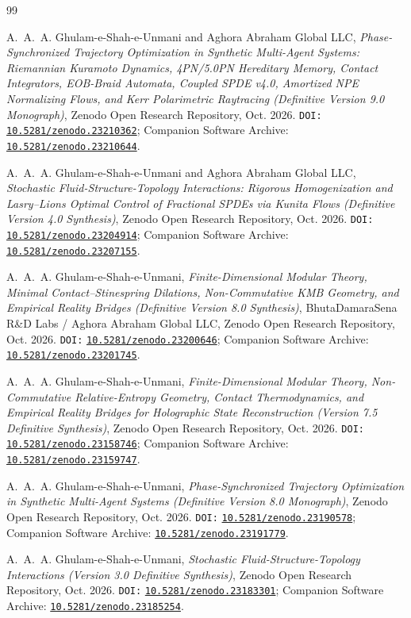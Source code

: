\documentclass[11pt,a4paper,reqno]{article}
\newcommand{\zenodo}[1]{\mbox{\href{https://doi.org/10.5281/zenodo.#1}{\texttt{10.5281/zenodo.#1}}}}
\theoremstyle{plain}
\theoremstyle{definition}
\theoremstyle{remark}
\numberwithin{equation}{section}
\begin{document}
\clearpage
\begin{thebibliography}{99}

A.~A.~A. Ghulam-e-Shah-e-Unmani and {Aghora Abraham Global LLC}, \emph{Phase-Synchronized Trajectory Optimization in Synthetic Multi-Agent Systems: Riemannian Kuramoto Dynamics, 4PN/5.0PN Hereditary Memory, Contact Integrators, EOB-Braid Automata, Coupled SPDE v4.0, Amortized NPE Normalizing Flows, and Kerr Polarimetric Raytracing (Definitive Version 9.0 Monograph)}, Zenodo Open Research Repository, Oct. 2026. \texttt{DOI:} \zenodo{23210362}; Companion Software Archive: \zenodo{23210644}.

A.~A.~A. Ghulam-e-Shah-e-Unmani and {Aghora Abraham Global LLC}, \emph{Stochastic Fluid-Structure-Topology Interactions: Rigorous Homogenization and Lasry--Lions Optimal Control of Fractional SPDEs via Kunita Flows (Definitive Version 4.0 Synthesis)}, Zenodo Open Research Repository, Oct. 2026. \texttt{DOI:} \zenodo{23204914}; Companion Software Archive: \zenodo{23207155}.

A.~A.~A. Ghulam-e-Shah-e-Unmani, \emph{Finite-Dimensional Modular Theory, Minimal Contact--Stinespring Dilations, Non-Commutative KMB Geometry, and Empirical Reality Bridges (Definitive Version 8.0 Synthesis)}, BhutaDamaraSena R\&D Labs / Aghora Abraham Global LLC, Zenodo Open Research Repository, Oct. 2026. \texttt{DOI:} \zenodo{23200646}; Companion Software Archive: \zenodo{23201745}.

A.~A.~A. Ghulam-e-Shah-e-Unmani, \emph{Finite-Dimensional Modular Theory, Non-Commutative Relative-Entropy Geometry, Contact Thermodynamics, and Empirical Reality Bridges for Holographic State Reconstruction (Version 7.5 Definitive Synthesis)}, Zenodo Open Research Repository, Oct. 2026. \texttt{DOI:} \zenodo{23158746}; Companion Software Archive: \zenodo{23159747}.

A.~A.~A. Ghulam-e-Shah-e-Unmani, \emph{Phase-Synchronized Trajectory Optimization in Synthetic Multi-Agent Systems (Definitive Version 8.0 Monograph)}, Zenodo Open Research Repository, Oct. 2026. \texttt{DOI:} \zenodo{23190578}; Companion Software Archive: \zenodo{23191779}.

A.~A.~A. Ghulam-e-Shah-e-Unmani, \emph{Stochastic Fluid-Structure-Topology Interactions (Version 3.0 Definitive Synthesis)}, Zenodo Open Research Repository, Oct. 2026. \texttt{DOI:} \zenodo{23183301}; Companion Software Archive: \zenodo{23185254}.


\end{thebibliography}
\end{document}
